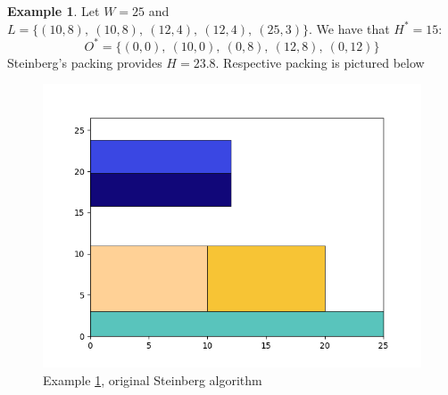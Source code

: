 \documentclass{article}
\theoremstyle{definition}
\newtheorem{example}{Example}
\theoremstyle{theorem}
\numberwithin{proposition}{section}
\begin{document}
    \begin{example}\label{ex5}
        Let $W = 25$ and $L = \{(10, 8),~(10, 8),~(12, 4),~(12, 4),~(25, 3)\}$. We have that $H^{*} = 15$:
        \begin{equation*}
            O^{*} = \{(0,0),~(10,0),~(0,8),~(12,8),~(0,12)\}
        \end{equation*}
        Steinberg’s packing provides $H = 23.8$. Respective packing is pictured below
        \begin{figure}[H]
            \centering
            \includegraphics[scale=0.5]{../examples/original-5.png}
            \caption{Example \ref{ex5}, original Steinberg algorithm}
        \end{figure} 
    \end{example}
\end{document}
